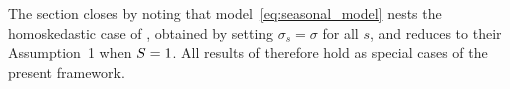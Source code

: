 The section closes by noting that model~\eqref{eq:seasonal_model}
nests the homoskedastic case of \citet{xu2023conformal}, obtained by
setting $\sigma_s = \sigma$ for all $s$, and reduces to their
Assumption~1 when $S = 1$.  All results of
\citet{xu2023conformal} therefore hold as special cases of the
present framework.
